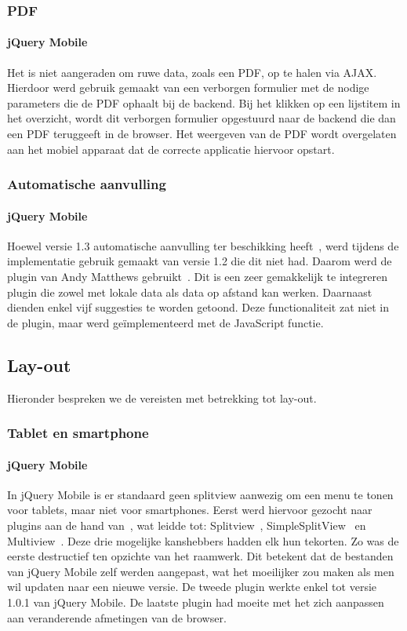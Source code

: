 \subsubsection{PDF}

\paragraph{jQuery Mobile} 
Het is niet aangeraden om ruwe data, zoals een PDF, op te halen via AJAX. Hierdoor werd gebruik gemaakt van een verborgen formulier met de nodige parameters die de PDF ophaalt bij de backend. Bij het klikken op een lijstitem in het overzicht, wordt dit verborgen formulier opgestuurd naar de backend die dan een PDF teruggeeft in de browser. Het weergeven van de PDF wordt overgelaten aan het mobiel apparaat dat de correcte applicatie hiervoor opstart.

\subsubsection{Automatische aanvulling}

\paragraph{jQuery Mobile} 
Hoewel versie 1.3 automatische aanvulling ter beschikking heeft~\cite{JQuery2013c}, werd tijdens de implementatie gebruik gemaakt van versie 1.2 die dit niet had. Daarom werd de plugin van Andy Matthews gebruikt~\cite{Matthews2013}. Dit is een zeer gemakkelijk te integreren plugin die zowel met lokale data als data op afstand kan werken. Daarnaast dienden enkel vijf suggesties te worden getoond. Deze functionaliteit zat niet in de plugin, maar werd geïmplementeerd met de JavaScript  functie.

\subsection{Lay-out}
Hieronder bespreken we de vereisten met betrekking tot lay-out.

\subsubsection{Tablet en smartphone}

\paragraph{jQuery Mobile} 
In jQuery Mobile is er standaard geen splitview aanwezig om een menu te tonen voor tablets, maar niet voor smartphones. Eerst werd hiervoor gezocht naar plugins aan de hand van~\cite{Deering2012}, wat leidde tot: Splitview~\cite{Rahman2013}, SimpleSplitView~\cite{Yared2013} en Multiview~\cite{Franck2012}. Deze drie mogelijke kanshebbers hadden elk hun tekorten. Zo was de eerste destructief ten opzichte van het raamwerk. Dit betekent dat de bestanden van jQuery Mobile zelf werden aangepast, wat het moeilijker zou maken als men wil updaten naar een nieuwe versie. De tweede plugin werkte enkel tot versie 1.0.1 van jQuery Mobile. De laatste plugin had moeite met het zich  aanpassen aan veranderende afmetingen van de browser. 

